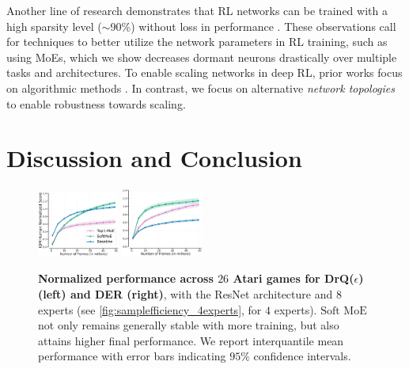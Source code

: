 \documentclass{article}
\theoremstyle{plain}
\theoremstyle{definition}
\theoremstyle{remark}
\newcommand{\softmoe}{$\textrm{Soft MoE}$}
\begin{document}
Another line of research demonstrates that RL networks can be trained with a high sparsity level ($\sim$90\%) without loss in performance \cite{tan2022rlx2,sokar2022dynamic,graesser2022state, obando2024deep}. These observations call for techniques to better utilize the network parameters in RL training, such as using MoEs, which we show decreases dormant neurons drastically over multiple tasks and architectures. To enable scaling networks in deep RL, prior works focus on algorithmic methods \citep{farebrother2022proto, taiga2022investigating, schwarzer23bbf, farebrother24classification}. In contrast, we focus on alternative {\em network topologies} to enable robustness towards scaling.


\section{Discussion and Conclusion}
\label{sec:Discussion and Conclusion}

\ifarxiv
\else
    \begin{figure}[!t]
        \centering
        \includegraphics[width=0.24\textwidth]{figures/DrQ_8CORRCOLOR_Johan2.pdf}%
         \includegraphics[width=0.24\textwidth]{figures/DER_8CORRCOLOR_Johan2.pdf}%
        \vspace{-0.4cm}
        \caption{\textbf{Normalized performance across $26$ Atari games for DrQ($\epsilon$) (left) and DER (right)}, with the ResNet architecture \citep{espeholt2018impala} and $8$ experts (see \autoref{fig:samplefficiency_4experts}, for $4$ experts). \softmoe{} not only remains generally stable with more training, but also attains higher final performance. We report interquantile mean performance with error bars indicating $95\%$ confidence intervals.}
        \label{fig:samplefficiency}
    \end{figure}
\fi
\end{document}
